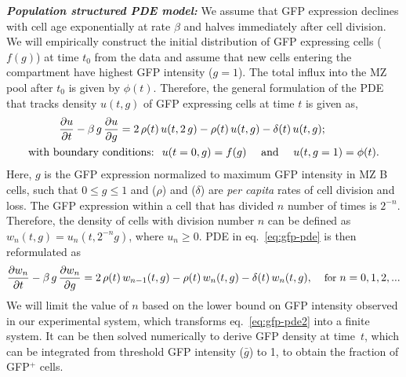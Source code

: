 \documentclass[11pt]{article}
\begin{document}
\textbf{\textit{Population structured PDE model:}}
We assume that GFP expression declines with cell age exponentially at rate $\beta$ and halves immediately after cell division.
We will empirically construct the initial distribution of GFP expressing cells ($f(g)$) at time $t_{0}$ from the data and
assume that new cells entering the compartment have highest GFP intensity ($g=1$).
The total influx into the MZ pool after $t_0$ is given by $\phi(t)$.
Therefore, the general formulation of the PDE that tracks density $u(t, g)$  of GFP expressing cells at time $t$ is given as,
\begin{equation}
\begin{aligned}
\small
\frac{\partial u}{\partial t}  - \beta \,g \, \frac{\partial u}{\partial g} = 2\,  \rho(t) & \, u(t, 2\,g) - \rho(t) \, u(t, g) - \delta(t)  \, u(t, g); 
\\
\text{with boundary conditions: }& \;  u(t=0, g) = f(g) \quad \text{ and } \quad u(t, g=1) = \phi(t).
\label{eq:gfp-pde}
\end{aligned}
\end{equation}
Here, $g$ is the GFP expression normalized to maximum GFP intensity in MZ B cells, such that $0 \le g \le 1$ and ($\rho$) and ($\delta$) are \textit{per capita} rates of cell division and loss.
The GFP expression within a cell that has divided $n$ number of times is $2^{-n}$. 
Therefore, the density of cells with division number $n$ can be defined as $w_{n}(t, g) = u_{n}(t, 2^{-n} g)$, where $u_{n} \ge 0$. %
PDE in eq.~\ref{eq:gfp-pde} is then reformulated as
\begin{equation} 
\small
\frac{\partial w_{n}}{\partial t}  - \beta \,g \, \frac{\partial w_{n}}{\partial g} = 2\, \rho(t)  \, w_{n-1}(t, g) - \rho(t) \, w_{n}(t, g)  - \delta(t)  \, w_{n}(t, g), \quad \, \text{for } n = 0, 1, 2, ...
\label{eq:gfp-pde2}
\end{equation}
We will limit the value of $n$ based on the lower bound on GFP intensity observed in our experimental system, which transforms {eq.~\ref{eq:gfp-pde2}} into a finite system.
It can be then solved numerically to derive GFP density at time~$t$, which can be integrated from threshold GFP intensity ($\bar{g}$) to 1, to obtain the fraction of GFP$^{+}$ cells. 
\end{document}
